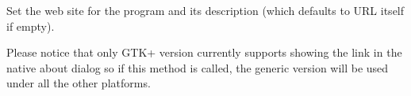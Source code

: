 \label{wxaboutdialoginfosetwebsite}


Set the web site for the program and its description (which defaults to URL
itself if empty).

Please notice that only GTK+ version currently supports showing the link in the
native about dialog so if this method is called, the generic version will be
used under all the other platforms.


